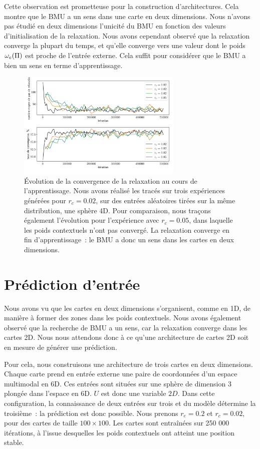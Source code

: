 \documentclass[../main]{subfiles}
\begin{document}
Cette observation est prometteuse pour la construction d'architectures. Cela montre que le BMU a un sens dans une carte en deux dimensions. 
Nous n'avons pas étudié en deux dimensions l'unicité du BMU en fonction des valeurs d'initialisation de la relaxation. Nous avons cependant observé que la relaxation converge la plupart du temps, et qu'elle converge vers une valeur dont le poids $\omega_e(\Pi)$ est proche de l'entrée externe. Cela suffit pour considérer que le BMU a bien un sens en terme d'apprentissage.

\begin{figure}
	\centering
	\includegraphics[width=0.7\textwidth]{conv_relax_2maps.pdf}
	\caption{\'Evolution de la convergence de la relaxation au cours de l'apprentissage. Nous avons réalisé les tracés sur trois expériences générées pour $r_c = 0.02$, sur des entrées aléatoires tirées sur la même distribution, une sphère 4D. Pour comparaison, nous traçons également l'évolution pour l'expérience avec $r_c = 0.05$, dans laquelle les poids contextuels n'ont pas convergé. La relaxation converge en fin d'apprentissage~: le BMU a donc un sens dans les cartes en deux dimensions. \label{fig:relax}}
\end{figure}

\section{Prédiction d'entrée}

Nous avons vu que les cartes en deux dimensions s'organisent, comme en 1D, de manière à former des zones dans les poids contextuels. 
Nous avons également observé que la recherche de BMU a un sens, car la relaxation converge dans les cartes 2D.
Nous nous attendons donc à ce qu'une architecture de cartes 2D soit en mesure de générer une prédiction.

Pour cela, nous construisons une architecture de trois cartes en deux dimensions. Chaque carte prend en entrée externe une paire de coordonnées d'un espace multimodal en 6D. Ces entrées sont situées sur une sphère de dimension 3 plongée dans l'espace en 6D. $U$ est donc une variable $2D$. 
Dans cette configuration, la connaissance de deux entrées sur trois et du modèle détermine la troisième~: la prédiction est donc possible.
Nous prenons $r_e = 0.2$ et $r_c = 0.02$, pour des cartes de taille $100 \times 100$. Les cartes sont entraînées sur 250 000 itérations, à l'issue desquelles les poids contextuels ont atteint une position stable.
\end{document}
